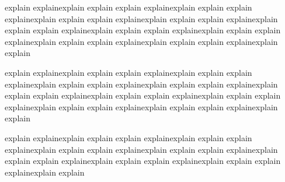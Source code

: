{explain explainexplain explain explain explainexplain explain explain explainexplain explain explain explainexplain explain
explain explainexplain explain explain explainexplain explain explain explainexplain explain explain explainexplain explain
explain explainexplain explain explain explainexplain explain

explain explainexplain explain explain explainexplain explain explain explainexplain explain explain explainexplain explain
explain explainexplain explain explain explainexplain explain explain explainexplain explain explain explainexplain explain
explain explainexplain explain explain explainexplain explain

explain explainexplain explain explain explainexplain explain explain explainexplain explain explain explainexplain explain
explain explainexplain explain explain explainexplain explain explain explainexplain explain explain explainexplain explain


 
}
